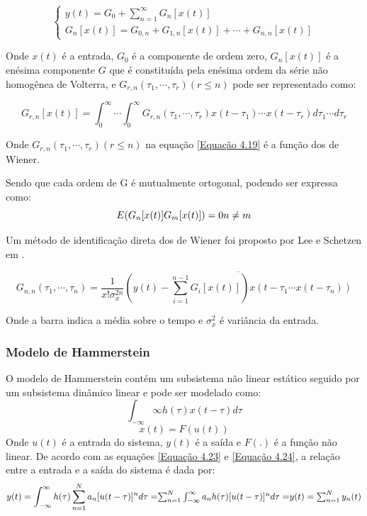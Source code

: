 \begin{equation}
\left\{\begin{array}{ll}y(t) = G_{0} + \sum_{n = 1}^{\infty} G_{n}[x(t)]\\G_{n}[x(t)] = G_{0,n} + G_{1,n}[x(t)]+ \cdots + G_{n,n}[x(t)]\end{array}\right.
\label{Equação 4.18}
\end{equation}

Onde $x(t)$ é a entrada, $G_{0}$ é a componente de ordem zero, $G_{n}[x(t)]$ é a enésima componente $G$ que é constituída pela enésima ordem da série não homogênea de Volterra, e $G_{r,n}(\tau_{1},\cdots,\tau_{r})(r \leq n)$ pode ser representado como:

\begin{equation}
G_{r,n}[x(t)] = \int_{0}^{\infty} \cdots \int_{0}^{\infty} G_{r,n}(\tau_{1},\cdots,\tau_{r})x(t-\tau_{1})\cdots x(t - \tau_{r})d\tau_{1}\cdots d\tau_{r}
\label{Equação 4.19}
\end{equation}

Onde $G_{r,n}(\tau_{1},\cdots,\tau_{r})(r \leq n)$ na equação \ref{Equação 4.19} é a função dos  de Wiener.

Sendo que cada ordem de G é mutualmente ortogonal, podendo ser expressa como:
\begin{equation}
E(G_{n}[x(t)]G_{m}[x(t)]) = 0$$
$$n \neq m 
\end{equation}


Um método de identificação direta dos  de Wiener foi proposto por Lee e Schetzen em \cite{lee1965measurement}.

\begin{equation}
G_{n,n}(\tau_{1},\cdots,\tau_{n}) = \dfrac{1}{x! \sigma_{x}^{2n}}  \overline{( y(t) - \sum_{i = 1}^{n -1}G_{i}[x(t)]) x(t-\tau_{1} \cdots x(t-\tau_{n}))}
\end{equation}

Onde a barra indica a média sobre o tempo e $\sigma_{x}^{2}$ é variância da entrada.



\subsubsection*{Modelo de Hammerstein}
O modelo de Hammerstein contém um subsistema não linear estático seguido por um subsistema dinâmico linear e pode ser modelado como:
\begin{equation}
\int_{- \infty}{\infty}h(\tau) x(t-\tau) d\tau
\label{Equação 4.23}
\end{equation}
\begin{equation}
x(t)=F(u(t))
\label{Equação 4.24}
\end{equation}
Onde $u(t)$ é a entrada do sistema, $y(t)$ é a saída e $F(.)$ é a função não linear. De acordo com as equações \ref{Equação 4.23} e \ref{Equação 4.24}, a relação entre a entrada e a saída do sistema é dada por:
\begin{equation}
y(t) = \int_{-\infty}^{\infty} h(\tau) \sum_{n=1}^{N}a_{n}[u(t-\tau)]^{n}d\tau =$$
$$ \sum_{n=1}^{N} \int_{-\infty}^{\infty}a_{n}h(\tau)[u(t-\tau)]^{n}d\tau =$$
$$ y(t) = \sum_{n=1}^{N} y_{n}(t)
\label{Equção 4.25}
\end{equation}

